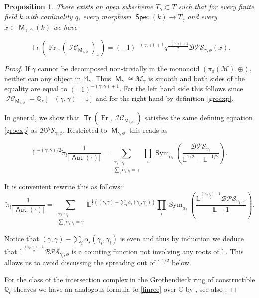 \documentclass{article}
\DeclareMathOperator{\Aut}{\mathsf{Aut}}
\DeclareMathOperator{\M}{{\mathsf{M}}}
\newcommand{\Mc}{\mathcal{M}}
\DeclareMathOperator{\Tr}{\mathsf{Tr}}
\DeclareMathOperator{\Fr}{Fr}
\DeclareMathOperator{\Spec}{\mathsf{Spec}}
\DeclareMathOperator{\Sym}{Sym}
\DeclareMathOperator{\CIC}{\mathcal{IC}}
\newcommand{\BC}{{\mathbb{C}}}
\newcommand{\BL}{{\mathbb{L}}}
\newcommand{\BM}{{\mathbb{M}}}
\newcommand{\BQ}{{\mathbb{Q}}}
\newcommand{\CM}{{\mathcal M}}
\newcommand{\BPS}{\mathcal{BPS} }
\theoremstyle{definition}
\theoremstyle{plain}
\newtheorem{proposition}[definition]{Proposition}
\begin{document}
\begin{proposition}\label{bpsic} There exists an open subscheme $T_\gamma \subset T$ such that for every finite field $k$ with cardinality $q$, every morphism $\Spec(k) \to T_\gamma$ and every $ x \in \M_{\gamma,\phi}(k)$ we have

\[\Tr(\Fr,\left(\CIC_{\M_{\gamma,\phi}}\right)_x) = (-1)^{-(\gamma,\gamma)+1} q^{\frac{-(\gamma,\gamma)+1}{2}} \BPS_{\gamma,\phi}(x).  \]
\end{proposition}

\begin{proof} If $\gamma$ cannot be decomposed non-trivially in the mononoid $(\pi_0(\Mc),\oplus)$, neither can any object in $\BM_{\gamma}$. Thus $\M_\gamma \cong \CM_\gamma$ is smooth and both sides of the equality are equal to $(-1)^{-(\gamma,\gamma)+1}$. For the left hand side this follows since $\CIC_{\M_{\gamma,\phi}} = \BQ_\ell[-(\gamma,\gamma)+1]$ and for the right hand by definition \eqref{groexp}.

In general, we show that $\Tr(\Fr,\CIC_{\M_{\gamma,\phi}}) $ satisfies the same defining equation \eqref{groexp} as $\BPS_{\gamma,\phi}$. Restricted to $\M_{\gamma,\phi}$ this reads as 

\[ \BL^{-(\gamma,\gamma)/2}\tilde{\pi}_{!}\frac{1}{|\Aut(\cdot)|} = \sum_{\substack{\alpha_i,\gamma_i\\ \sum_i \alpha_i \gamma_i = \gamma}} \prod_i \Sym_{\alpha_i}\left(\frac{ \BPS_{\gamma_i}}{\BL^{1/2}-\BL^{-1/2}} \right) . \]



It is convenient rewrite this as follows: 
\begin{equation}\label{finrec} \tilde{\pi}_{!}\frac{1}{|\Aut(\cdot)|} = \sum_{\substack{\alpha_i,\gamma_i\\ \sum_i \alpha_i \gamma_i =\gamma}} \BL^{\frac{1}{2}\left((\gamma,\gamma) - \sum_i \alpha_i (\gamma_i,\gamma_i)  \right)}  \prod_i \Sym_{\alpha_i}\left(\frac{\BL^{\frac{(\gamma_i,\gamma_i)-1}{2}} \BPS_{\gamma_i,x}}{\BL-1} \right) . \end{equation}

Notice that $(\gamma,\gamma) - \sum_i \alpha_i (\gamma_i,\gamma_i)  $ is even and thus by induction we deduce that $\BL^{\frac{(\gamma_i,\gamma_i)-1}{2}} \BPS_{\gamma_i,\phi}$ is a counting function not involving any roots of $\BL$. This allows us to avoid discussing the spreading out of $\BL^{1/2}$ below. 
 
For the class of the intersection complex in the Grothendieck ring of constructible $\BQ_\ell$-sheaves we have an analogous formula to \eqref{finrec} over $\BC$ by \cite[Theorem 5.6]{Me15}, see also \cite[Theorem 10.2.7]{BDNKP25}:


\end{proof}
\end{document}
